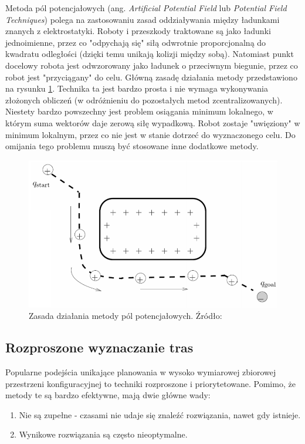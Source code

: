 Metoda pól potencjałowych (ang. {\it Artificial Potential Field} lub {\it Potential Field Techniques}) polega na zastosowaniu zasad oddziaływania między ładunkami znanych z elektrostatyki. Roboty i przeszkody traktowane są jako ładunki jednoimienne, przez co "odpychają się" siłą odwrotnie proporcjonalną do kwadratu odległości (dzięki temu unikają kolizji między sobą). Natomiast punkt docelowy robota jest odwzorowany jako ładunek o przeciwnym biegunie, przez co robot jest "przyciągany" do celu.
Główną zasadę działania metody przedstawiono na rysunku \ref{fig:image_potentialfield}.
Technika ta jest bardzo prosta i nie wymaga wykonywania złożonych obliczeń (w odróżnieniu do pozostałych metod zcentralizowanych). Niestety bardzo powszechny jest problem osiągania minimum lokalnego, w którym suma wektorów daje zerową siłę wypadkową. Robot zostaje "uwięziony" w minimum lokalnym, przez co nie jest w stanie dotrzeć do wyznaczonego celu. Do omijania tego problemu muszą być stosowane inne dodatkowe metody. \cite{potentialfield}
\begin{figure}[H]
	\centering
	\includegraphics[width=12cm]{img/potential-field}
	\caption{Zasada działania metody pól potencjałowych. Źródło: \cite{howie_potentialfield}}
	\label{fig:image_potentialfield}
\end{figure}

\subsection{Rozproszone wyznaczanie tras}
Popularne podejścia unikające planowania w wysoko wymiarowej zbiorowej przestrzeni konfiguracyjnej to techniki rozproszone i priorytetowane.
Pomimo, że metody te są bardzo efektywne, mają dwie główne wady:
\begin{enumerate}
	\item Nie są zupełne - czasami nie udaje się znaleźć rozwiązania, nawet gdy istnieje.
	\item Wynikowe rozwiązania są często nieoptymalne.
\end{enumerate}

